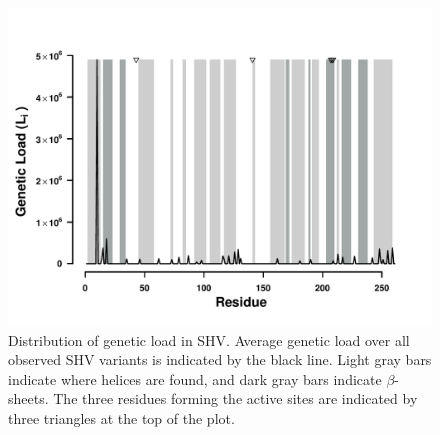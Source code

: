 \documentclass[12pt]{article}
\begin{document}
\begin{figure}[H]
     \centering
	\includegraphics[width=\textwidth]{img/GL_slide_SHV2016}
	\caption{Distribution of genetic load in SHV. 
	Average genetic load over all observed SHV variants is indicated by the black line. 
	Light gray bars indicate where helices are found, and dark gray bars indicate $\beta$-sheets.
	The three residues forming the active sites are indicated by three triangles at the top of the plot.}
	\label{fig:shv2016_sse}
\end{figure}
\end{document}
